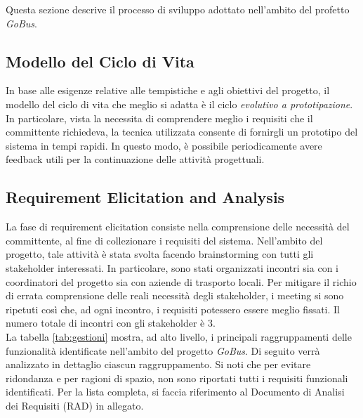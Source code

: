 Questa sezione descrive il processo di sviluppo adottato nell\rq ambito del profetto \emph{GoBus}.

\subsection{Modello del Ciclo di Vita}
In base alle esigenze relative alle tempistiche e agli obiettivi del progetto, il modello del ciclo di vita che meglio si adatta \`{e} il ciclo \emph{evolutivo a prototipazione}. In particolare, vista la necessita di comprendere meglio i requisiti che il committente richiedeva, la tecnica utilizzata consente di fornirgli un prototipo del sistema in tempi rapidi. In questo modo, \`{e} possibile periodicamente avere feedback utili per la continuazione delle attivit\`{a} progettuali.

\subsection{Requirement Elicitation and Analysis}
La fase di requirement elicitation consiste nella comprensione delle necessit\`{a} del committente, al fine di collezionare i requisiti del sistema. Nell\rq ambito del progetto, tale attivit\`{a} \`{e} stata svolta facendo brainstorming con tutti gli stakeholder interessati. In particolare, sono stati organizzati incontri sia con i coordinatori del progetto sia con aziende di trasporto locali. Per mitigare il richio di errata comprensione delle reali necessit\`{a} degli stakeholder, i meeting si sono ripetuti cos\`{i} che, ad ogni incontro, i requisiti potessero essere meglio fissati. Il numero totale di incontri con gli stakeholder \`{e} 3.\\
La tabella \ref{tab:gestioni} mostra, ad alto livello, i principali raggruppamenti delle funzionalit\`{a} identificate nell'ambito del progetto \emph{GoBus}. Di seguito verr\`{a} analizzato in dettaglio ciascun raggruppamento. Si noti che per evitare ridondanza e per ragioni di spazio, non sono riportati tutti i requisiti funzionali identificati. Per la lista completa, si faccia riferimento al Documento di Analisi dei Requisiti (RAD) in allegato.\\

